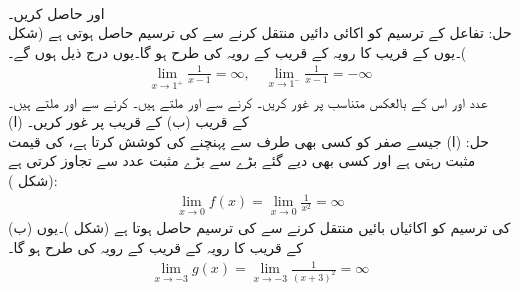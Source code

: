 \\
 اور   حاصل کریں۔\\
حل:\quad
{} تفاعل  کے ترسیم کو  اکائی دائیں منتقل کرنے سے  کی ترسیم حاصل ہوتی ہے (شکل )۔یوں  کے قریب  کا رویہ  کے قریب  کے رویہ کی طرح ہو گا۔یوں درج ذیل ہوں گے۔
\begin{align*}
\lim_{x\to 1^+}\frac{1}{x-1}=\infty,\quad\lim_{x\to 1^-}\frac{1}{x-1}=-\infty
\end{align*}
 عدد  اور اس کے بالعکس متناسب  پر غور کریں۔ کرنے سے  اور  ملتے ہیں۔ کرنے سے  اور  ملتے ہیں۔
\\
(ا)\quad 
{} کے قریب  (ب)  کے قریب  پر غور کریں۔\\
حل: \quad (ا) جیسے  صفر کو کسی بھی طرف سے پہنچنے کی کوشش کرتا ہے،  کی قیمت مثبت رہتی ہے اور کسی بھی دیے گئے بڑے سے بڑے مثبت عدد   سے تجاوز کرتی ہے (شکل ):
\begin{align*}
\lim_{x\to 0}f(x)=\lim_{x\to 0}\frac{1}{x^2}=\infty
\end{align*}
(ب)  کی ترسیم کو  اکائیاں بائیں منتقل کرنے سے  کی ترسیم حاصل ہوتا ہے (شکل )۔یوں  کے قریب  کا رویہ   کے قریب  کے رویہ کی طرح ہو گا۔
\begin{align*}
\lim_{x\to -3}g(x)=\lim_{x\to -3}\frac{1}{(x+3)^2}=\infty
\end{align*}
%
